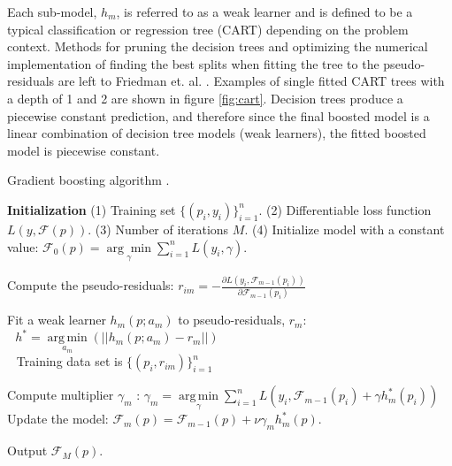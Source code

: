 Each sub-model, $h_m$, is referred to as a weak learner and is defined to be a typical classification or regression tree (CART) depending on the problem context.  Methods for pruning the decision trees and optimizing the numerical implementation of finding the best splits when fitting the tree to the pseudo-residuals are left to Friedman et. al. \cite{friedman2002}.  Examples of single fitted CART trees with a depth of 1 and 2 are shown in figure \ref{fig:cart}.  Decision trees produce a piecewise constant prediction, and therefore since the final boosted model is a linear combination of decision tree models (weak learners), the fitted boosted model is piecewise constant.

\begin{algorithm}[H]
    \caption{Gradient boosting algorithm \cite{friedman2002}.}
    \begin{algorithmic}[1]
    \STATE \textbf{Initialization}
    \STATE (1) Training set $\{(p_i, y_i)\}_{i=1}^n$.
    \STATE (2) Differentiable loss function $L(y, \mathcal F(p))$.
    \STATE (3) Number of iterations ${{M}}$.
    \STATE (4)   Initialize model with a constant value:
        $\mathcal F_0(p) = \underset{\gamma}{\arg\min} \sum_{i=1}^n L(y_i, \gamma).$

        \STATE Compute the pseudo-residuals:
            \STATE $r_{im} = -\frac{\partial L(y_i, \mathcal F_{m-1}(p_i))}{\partial \mathcal F_{m-1}(p_i)}$
        \ENDFOR

        \STATE Fit a weak learner $h_m(p; a_m)$ to pseudo-residuals, $r_{m}$: \\
            $\ \ \ h^* = \underset{a_m}{\operatorname{arg\,min}}(||h_m(p; a_m) - r_m||)$ \\
            $\ \ $ Training data set is $\{(p_i, r_{im})\}_{i=1}^n$ \;

        \STATE Compute multiplier $\gamma_m$ :
        $\gamma_m = \underset{\gamma}{\operatorname{arg\,min}} \sum_{i=1}^n L\left(y_i, \mathcal F_{m-1}(p_i) + \gamma h^*_m(p_i)\right)$\;
        \STATE Update the model:
        $\mathcal F_m(p) = \mathcal F_{m-1}(p) + \nu \gamma_m h^*_m(p).$

    \ENDFOR
    \STATE Output $\mathcal F_M(p).$
    \end{algorithmic}
\label{alg:boosting}
\end{algorithm}

